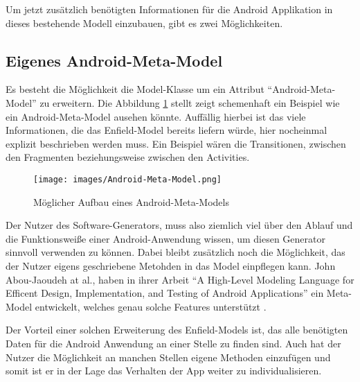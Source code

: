 Um jetzt zusätzlich benötigten Informationen für die Android Applikation in dieses bestehende Modell einzubauen, gibt es zwei Möglichkeiten.

\subsection{Eigenes Android-Meta-Model}

Es besteht die Möglichkeit die Model-Klasse um ein Attribut \enquote{Android-Meta-Model} zu erweitern.
Die Abbildung \ref{fig:android-model} stellt zeigt schemenhaft ein Beispiel wie ein Android-Meta-Model ausehen könnte. Auffällig hierbei ist das viele Informationen, die das Enfield-Model bereits liefern würde, hier nocheinmal explizit beschrieben werden muss. Ein Beispiel wären die Transitionen, zwischen den Fragmenten beziehungsweise zwischen den Activities. 


\begin{figure}[H]
	\begin{center}
		\texttt{[image: images/Android-Meta-Model.png]}
		\caption{Möglicher Aufbau eines Android-Meta-Models}
		\label{fig:android-model}
	\end{center}
\end{figure}

Der Nutzer des Software-Generators, muss also ziemlich viel über den Ablauf und die Funktionsweiße einer Android-Anwendung wissen, um diesen Generator sinnvoll verwenden zu können.
Dabei bleibt zusätzlich noch die Möglichkeit, das der Nutzer eigens geschriebene Metohden in das Model einpflegen kann. John Abou-Jaoudeh at al., haben in ihrer Arbeit \enquote{A High-Level Modeling Language for Efficent Design, Implementation, and Testing of Android Applications} ein Meta-Model entwickelt, welches genau solche Features unterstützt \cite{abou2015high}.

Der Vorteil einer solchen Erweiterung des Enfield-Models ist, das alle benötigten Daten für die Android Anwendung an einer Stelle zu finden sind. Auch hat der Nutzer die Möglichkeit an manchen Stellen eigene Methoden einzufügen und somit ist er in der Lage das Verhalten der App weiter zu individualisieren.

